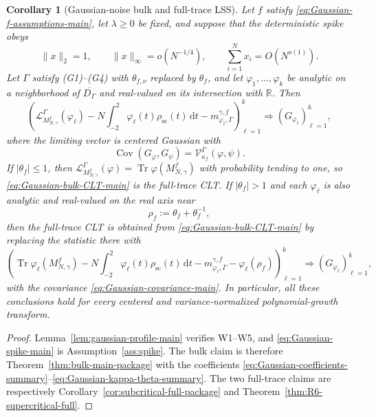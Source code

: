 \documentclass[11pt]{article}
\newtheorem{corollary}[theorem]{Corollary}
\theoremstyle{definition}
\theoremstyle{remark}
\newcommand{\Cov}{\operatorname{Cov}}
\newcommand{\Tr}{\operatorname{Tr}}
\newcommand{\scal}{\mathrm{sc}}
\newcommand{\dd}{\mathrm d}
\newcommand{\norm}[1]{\lVert #1\rVert}
\begin{document}
\begin{corollary}[Gaussian-noise bulk and full-trace LSS]
\label{cor:gaussian-LSS-main}
Let $f$ satisfy \eqref{eq:Gaussian-f-assumptions-main}, let $\lambda\ge0$ be
fixed, and suppose that the deterministic spike obeys
\begin{equation}\label{eq:Gaussian-spike-main}
 \norm{x}_2=1,
 \qquad
 \norm{x}_\infty=o(N^{-1/4}),
 \qquad
 \sum_{i=1}^N x_i=O(N^{o(1)}).
\end{equation}
Let $\Gamma$ satisfy (G1)--(G4) with $\theta_{f,\nu}$ replaced by $\theta_f$,
and let $\varphi_1,\ldots,\varphi_k$ be analytic on a neighborhood of
$\overline{D_\Gamma}$ and real-valued on its intersection with $\mathbb R$.
Then
\begin{equation}\label{eq:Gaussian-bulk-CLT-main}
 \left(
 \mathcal L_{M_{N,\gamma}^f}^{\Gamma}(\varphi_\ell)
 -N\int_{-2}^2\varphi_\ell(t)\rho_{\scal}(t)\,\dd t
 -m_{\varphi_\ell,\Gamma}^{\gamma,f}
 \right)_{\ell=1}^k
 \Longrightarrow
 (G_{\varphi_\ell})_{\ell=1}^k,
\end{equation}
where the limiting vector is centered Gaussian with
\begin{equation}\label{eq:Gaussian-covariance-main}
 \Cov(G_\varphi,G_\psi)
 =\mathcal V_{\kappa_f}^{\Gamma}(\varphi,\psi).
\end{equation}
If $|\theta_f|\le1$, then
$\mathcal L_{M_{N,\gamma}^f}^{\Gamma}(\varphi)
=\Tr\varphi(M_{N,\gamma}^f)$ with probability tending to one, so
\eqref{eq:Gaussian-bulk-CLT-main} is the full-trace CLT.  If
$|\theta_f|>1$ and each $\varphi_\ell$ is also analytic and real-valued on the
real axis near
\begin{equation}\label{eq:Gaussian-outlier-main}
 \rho_f:=\theta_f+\theta_f^{-1},
\end{equation}
then the full-trace CLT is obtained from
\eqref{eq:Gaussian-bulk-CLT-main} by replacing the statistic there with
\begin{equation}\label{eq:Gaussian-full-supercritical-main}
 \left(
 \Tr\varphi_\ell(M_{N,\gamma}^f)
 -N\int_{-2}^2\varphi_\ell(t)\rho_{\scal}(t)\,\dd t
 -m_{\varphi_\ell,\Gamma}^{\gamma,f}
 -\varphi_\ell(\rho_f)
 \right)_{\ell=1}^k
 \Longrightarrow
 (G_{\varphi_\ell})_{\ell=1}^k,
\end{equation}
with the covariance \eqref{eq:Gaussian-covariance-main}.
In particular, all these conclusions hold for every centered and
variance-normalized polynomial-growth transform.
\end{corollary}

\begin{proof}
Lemma~\ref{lem:gaussian-profile-main} verifies W1--W5, and
\eqref{eq:Gaussian-spike-main} is Assumption~\ref{ass:spike}.  The bulk claim
is therefore Theorem~\ref{thm:bulk-main-package} with the coefficients
\eqref{eq:Gaussian-coefficients-summary}--\eqref{eq:Gaussian-kappa-theta-summary}.
The two full-trace claims are respectively
Corollary~\ref{cor:subcritical-full-package} and
Theorem~\ref{thm:R6-supercritical-full}.
\end{proof}
\end{document}

